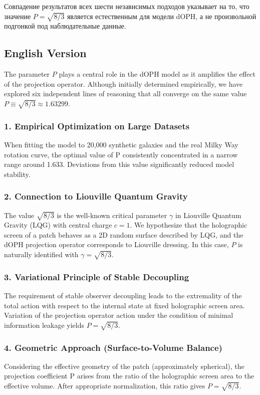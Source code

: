 \documentclass[11pt,a4paper]{article}
\begin{document}
Совпадение результатов всех шести независимых подходов указывает на то, что значение 
\( P = \sqrt{8/3} \) является естественным для модели dOPH, а не произвольной 
подгонкой под наблюдательные данные.

\subsection{English Version}

The parameter \( P \) plays a central role in the dOPH model as it amplifies the 
effect of the projection operator. Although initially determined empirically, we 
have explored six independent lines of reasoning that all converge on the same value 
\( P \equiv \sqrt{8/3} \approx 1.63299 \).

\subsubsection{1. Empirical Optimization on Large Datasets}
When fitting the model to 20,000 synthetic galaxies and the real Milky Way rotation 
curve, the optimal value of P consistently concentrated in a narrow range around 1.633. 
Deviations from this value significantly reduced model stability.

\subsubsection{2. Connection to Liouville Quantum Gravity}
The value \( \sqrt{8/3} \) is the well-known critical parameter \(\gamma\) in 
Liouville Quantum Gravity (LQG) with central charge \( c = 1 \). We hypothesize that 
the holographic screen of a patch behaves as a 2D random surface described by LQG, 
and the dOPH projection operator corresponds to Liouville dressing. In this case, 
\( P \) is naturally identified with \(\gamma = \sqrt{8/3}\).

\subsubsection{3. Variational Principle of Stable Decoupling}
The requirement of stable observer decoupling leads to the extremality of the total 
action with respect to the internal state at fixed holographic screen area. Variation 
of the projection operator action under the condition of minimal information leakage 
yields \( P = \sqrt{8/3} \).

\subsubsection{4. Geometric Approach (Surface-to-Volume Balance)}
Considering the effective geometry of the patch (approximately spherical), the 
projection coefficient P arises from the ratio of the holographic screen area to the 
effective volume. After appropriate normalization, this ratio gives \( P = \sqrt{8/3} \).
\end{document}
